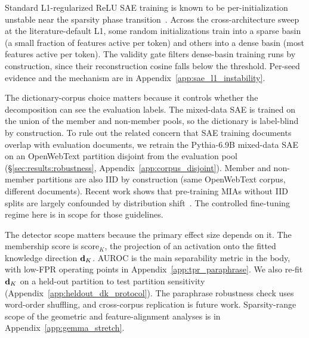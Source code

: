 Standard L1-regularized ReLU SAE training is known to be per-initialization unstable near the sparsity phase transition~\citep{bricken2023monosemanticity, templeton2024scaling}. Across the cross-architecture sweep at the literature-default L1, some random initializations train into a sparse basin (a small fraction of features active per token) and others into a dense basin (most features active per token). The validity gate filters dense-basin training runs by construction, since their reconstruction cosine falls below the threshold. Per-seed evidence and the mechanism are in Appendix~\ref{app:sae_l1_instability}.

The dictionary-corpus choice matters because it controls whether the decomposition can see the evaluation labels. The mixed-data SAE is trained on the union of the member and non-member pools, so the dictionary is label-blind by construction. To rule out the related concern that SAE training documents overlap with evaluation documents, we retrain the Pythia-6.9B mixed-data SAE on an OpenWebText partition disjoint from the evaluation pool (\S\ref{sec:results:robustness}, Appendix~\ref{app:corpus_disjoint}). Member and non-member partitions are also IID by construction (same OpenWebText corpus, different documents). Recent work shows that pre-training MIAs without IID splits are largely confounded by distribution shift~\citep{maini2024dataset, duan2024membership}. The controlled fine-tuning regime here is in scope for those guidelines.

The detector scope matters because the primary effect size depends on it. The membership score is score$_K$, the projection of an activation onto the fitted knowledge direction $\mathbf{d}_K$. AUROC is the main separability metric in the body, with low-FPR operating points in Appendix~\ref{app:tpr_paraphrase}. We also re-fit $\mathbf{d}_K$ on a held-out partition to test partition sensitivity (Appendix~\ref{app:heldout_dk_protocol}). The paraphrase robustness check uses word-order shuffling, and cross-corpus replication is future work. Sparsity-range scope of the geometric and feature-alignment analyses is in Appendix~\ref{app:gemma_stretch}.